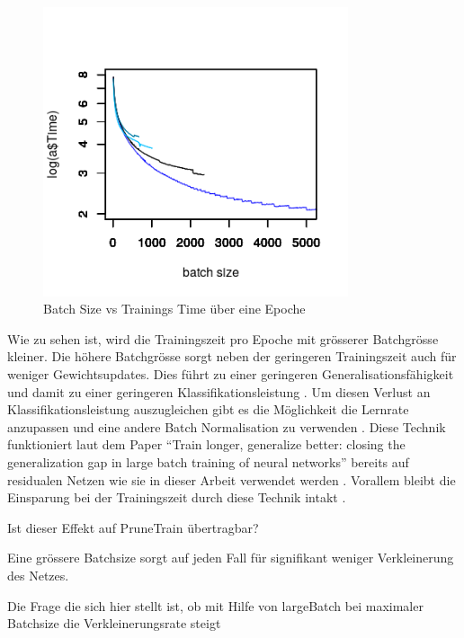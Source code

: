 \begin{figure}[h]
 \centering
 \includegraphics[width=0.8\textwidth]{KapitelPartB/Images/batchSizevsTime.png}
 \caption{Batch Size vs Trainings Time über eine Epoche}
 \label{fig:batchVsTime}
\end{figure}


Wie zu sehen ist, wird die Trainingszeit pro Epoche mit grösserer Batchgrösse kleiner. Die höhere Batchgrösse sorgt neben der geringeren Trainingszeit auch für weniger Gewichtsupdates. Dies führt zu einer geringeren Generalisationsfähigkeit und damit zu einer geringeren Klassifikationsleistung \cite{largeBatch}. Um diesen Verlust an Klassifikationsleistung auszugleichen gibt es die Möglichkeit die Lernrate anzupassen und eine andere Batch Normalisation zu verwenden \cite{largeBatch}. Diese Technik funktioniert laut dem Paper "`Train longer, generalize better: closing the generalization gap in large batch training of neural networks"' bereits auf residualen Netzen wie sie in dieser Arbeit verwendet werden \cite{largeBatch}. Vorallem bleibt die Einsparung bei der Trainingszeit durch diese Technik intakt \cite{largeBatch}.

Ist dieser Effekt auf PruneTrain übertragbar?


Eine grössere Batchsize sorgt auf jeden Fall für signifikant weniger Verkleinerung des Netzes.

Die Frage die sich hier stellt ist, ob mit Hilfe von largeBatch bei maximaler Batchsize die Verkleinerungsrate steigt  





